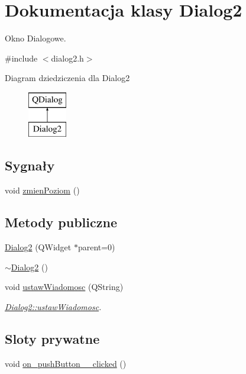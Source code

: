 \hypertarget{classDialog2}{\section{Dokumentacja klasy Dialog2}
\label{classDialog2}
}


Okno Dialogowe.  




{\ttfamily \#include $<$dialog2.\-h$>$}

Diagram dziedziczenia dla Dialog2\begin{figure}[H]
\begin{center}
\leavevmode
\includegraphics[height=2.000000cm]{classDialog2}
\end{center}
\end{figure}
\subsection*{Sygnały}
\begin{DoxyCompactItemize}
\item 
void \hyperlink{classDialog2_a05e8df578a22d2428319b06f65512fd4}{zmien\-Poziom} ()
\end{DoxyCompactItemize}
\subsection*{Metody publiczne}
\begin{DoxyCompactItemize}
\item 
\hyperlink{classDialog2_a78ae31daad000669cd54a31271ce9470}{Dialog2} (Q\-Widget $\ast$parent=0)
\item 
\hyperlink{classDialog2_ae4ceaef72d01b76dcd126b54c875dfaa}{$\sim$\-Dialog2} ()
\item 
void \hyperlink{classDialog2_a7c9262df7b7ea4f6250abdb0f6612a5f}{ustaw\-Wiadomosc} (Q\-String)
\begin{DoxyCompactList}\small\item\em \hyperlink{classDialog2_a7c9262df7b7ea4f6250abdb0f6612a5f}{Dialog2\-::ustaw\-Wiadomosc}. \end{DoxyCompactList}\end{DoxyCompactItemize}
\subsection*{Sloty prywatne}
\begin{DoxyCompactItemize}
\item 
void \hyperlink{classDialog2_a50271de9b195c7b846e00c1f789ddf4e}{on\-\_\-push\-Button\-\_\-\_\-clicked} ()
\end{DoxyCompactItemize}
